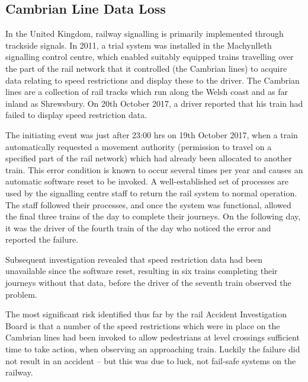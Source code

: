 \subsection{Cambrian Line Data Loss} \label{bkm:incacc:cambrian}

In the United Kingdom, railway signalling is primarily implemented through trackside signals. In 2011, a trial system was installed in the Machynlleth signalling control centre, which enabled suitably equipped trains travelling over the part of the rail network that it controlled (the Cambrian lines) to acquire data relating to speed restrictions and display these to the driver. The Cambrian lines are a collection of rail tracks which run along the Welsh coast and as far inland as Shrewsbury. On 20th October 2017, a driver reported that his train had failed to display speed restriction data.

The initiating event was just after 23:00 hrs on 19th October 2017, when a train automatically requested a movement authority (permission to travel on a specified part of the rail network) which had already been allocated to another train. This error condition is known to occur several times per year and causes an automatic software reset to be invoked. A well-established set of processes are used by the signalling centre staff to return the rail system to normal operation. The staff followed their processes, and once the system was functional, allowed the final three trains of the day to complete their journeys. On the following day, it was the driver of the fourth train of the day who noticed the error and reported the failure.

Subsequent investigation revealed that speed restriction data had been unavailable since the software reset, resulting in six trains completing their journeys without that data, before the driver of the seventh train observed the problem. 

The most significant risk identified thus far by the rail Accident Investigation Board is that a number of the speed restrictions which were in place on the Cambrian lines had been invoked to allow pedestrians at level crossings sufficient time to take action, when observing an approaching train. Luckily the failure did not result in an accident -- but this was due to luck, not fail-safe systems on the railway.

